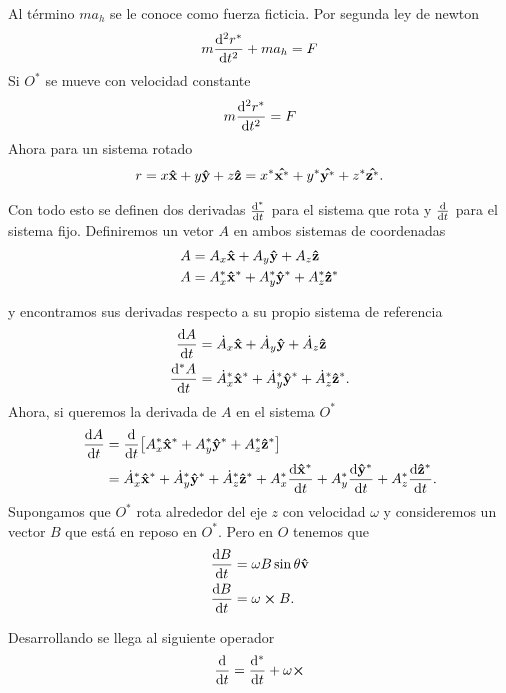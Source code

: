 Al término $ma_h$ se le conoce como fuerza ficticia. Por segunda ley de newton
\begin{equation}
	m\dv[2]{r^*}{t} + ma_h = F
\end{equation}
Si $O^*$ se mueve con velocidad constante
	$$ m\dv[2]{r^*}{t} = F $$
Ahora para un sistema rotado
\begin{equation}
	r = x\vu{x} + y\vu{y} + z\vu{z} = x^* \vu{x^*} + y^* \vu{y^*} + z^* \vu{z^*}.
\end{equation}

Con todo esto se definen dos derivadas $\dv{^*}{t}$ para el sistema que rota y $\dv{t}$ para el sistema fijo. Definiremos un vetor $A$ en ambos sistemas de coordenadas
\begin{align*}
	A &= A_x \vu{x} + A_y \vu{y} + A_z \vu{z} \\
	A &= A_x ^* \vu{x}^* + A_y ^* \vu{y}^* + A_z ^* \vu{z}^*
\end{align*}

y encontramos sus derivadas respecto a su propio sistema de referencia
\begin{align*}
	\dv{A}{t} &= \dot{A}_x \vu{x} + \dot{A}_y \vu{y} + \dot{A}_z \vu{z} \\
	\dv{^* A}{t} &= \dot{A}_x ^* \vu{x}^* + \dot{A}_y ^* \vu{y}^* + \dot{A}_z ^* \vu{z}^* .
\end{align*}
Ahora, si queremos la derivada de $A$ en el sistema $O^*$
\begin{align*}
	\dv{A}{t} &= \dv{t} \qty[A_x ^* \vu{x}^* + A_y ^* \vu{y}^* + A_z ^* \vu{z}^*] \\
	&= \dot{A}_x ^* \vu{x}^* + \dot{A}_y ^* \vu{y}^* + \dot{A}_z ^* \vu{z}^* + A_x ^* \dv{\vu{x}^*}{t} + A_y ^* \dv{\vu{y}^*}{t} + A_z ^* \dv{\vu{z}^*}{t}.
\end{align*}
Supongamos que $O^*$ rota alrededor del eje $z$ con velocidad $\omega$ y consideremos un vector $B$ que está en reposo en $O^*$. Pero en $O$ tenemos que
	\begin{align*}
		\dv{B}{t} &= \omega B\sin \theta \vu{v} \\
		\dv{B}{t} &= \omega \cp B .
	\end{align*}

Desarrollando se llega al siguiente operador
\begin{equation}
	\dv{t} = \dv{^*}{t} + \omega \cp
\end{equation}

